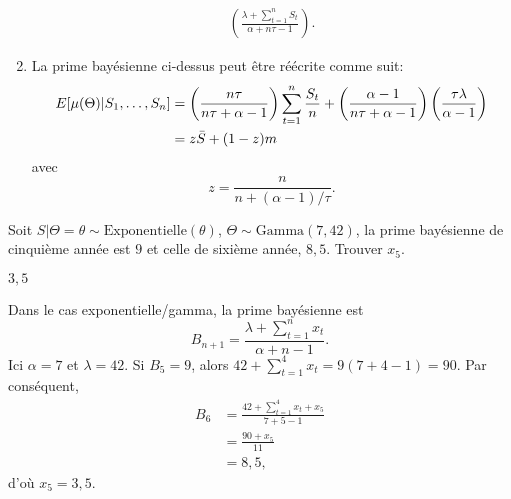 \begin{exercice}
\begin{sol}
\begin{enumerate}
\begin{align*}
        \left(
          \frac{\lambda + \sum_{t=1}^n S_t}{\alpha + n\tau - 1}
        \right).
      \end{align*}
    \item La prime bayésienne ci-dessus peut être réécrite comme suit:
      \begin{align*}
        E [ \mu(\Theta)|S_1, \dots, S_n ]
        &= \left(\frac{n\tau}{n\tau + \alpha - 1}\right) \sum_{t=1}^n
        \frac{S_t}{n} + \left(\frac{\alpha - 1}{n\tau + \alpha - 1}\right)
        \left(\frac{\tau \lambda}{\alpha-1}\right) \\
        &= z \bar{S} + (1 - z) m
      \end{align*}
      avec
      \begin{equation*}
        z = \frac{n}{n + (\alpha - 1)/\tau}.
      \end{equation*}
    \end{enumerate}
  \end{sol}
\end{exercice}

\begin{exercice}
  Soit $S|\Theta = \theta \sim \text{Exponentielle}(\theta)$,
  $\Theta \sim \text{Gamma}(7, 42)$, la prime bayésienne de
  cinquième année est $9$ et celle de sixième année, $8,5$. Trouver
  $x_5$.
  \begin{rep}
    $3,5$
  \end{rep}
  \begin{sol}
    Dans le cas exponentielle/gamma, la prime bayésienne est
    \begin{equation*}
      B_{n + 1} = \frac{\lambda + \sum_{t=1}^n x_t}{\alpha + n - 1}.
    \end{equation*}
    Ici $\alpha = 7$ et $\lambda = 42$. Si $B_5 = 9$, alors $42 +
    \sum_{t=1}^4 x_t = 9(7 + 4 - 1) = 90$. Par conséquent,
    \begin{align*}
      B_6
      &= \frac{42 + \sum_{t=1}^4 x_t + x_5}{7 + 5 - 1} \\
      &= \frac{90 + x_5}{11} \\
      &= 8,5,
    \end{align*}
    d'où $x_5 = 3,5$.
  \end{sol}
\end{exercice}

